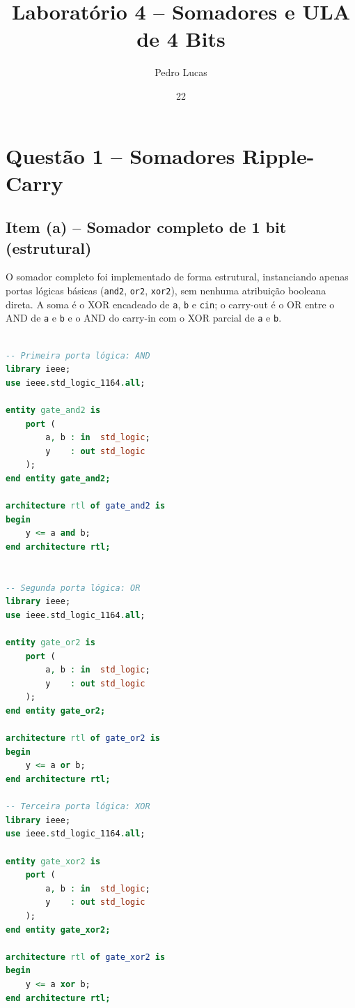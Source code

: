 \documentclass[report, 12pt]{uftreport}
\title{Laboratório 4 -- Somadores e ULA de 4 Bits}
\author{Pedro Lucas}{Moreira}
\date{22}{9}{2026}
\begin{document}
\frontmatter
\maketitle
\makefrontpage

\mainmatter
{}

\chapter{Questão 1 -- Somadores Ripple-Carry}

\section{Item (a) -- Somador completo de 1 bit (estrutural)}

O somador completo foi implementado de forma estrutural, instanciando apenas portas lógicas básicas (\texttt{and2}, \texttt{or2}, \texttt{xor2}), sem nenhuma atribuição booleana direta. A soma é o XOR encadeado de \texttt{a}, \texttt{b} e \texttt{cin}; o carry-out é o OR entre o AND de \texttt{a} e \texttt{b} e o AND do carry-in com o XOR parcial de \texttt{a} e \texttt{b}.

\begin{lstlisting}[language=VHDL]

-- Primeira porta lógica: AND
library ieee;
use ieee.std_logic_1164.all;

entity gate_and2 is
    port (
        a, b : in  std_logic;
        y    : out std_logic
    );
end entity gate_and2;

architecture rtl of gate_and2 is
begin
    y <= a and b;
end architecture rtl;


-- Segunda porta lógica: OR
library ieee;
use ieee.std_logic_1164.all;

entity gate_or2 is
    port (
        a, b : in  std_logic;
        y    : out std_logic
    );
end entity gate_or2;

architecture rtl of gate_or2 is
begin
    y <= a or b;
end architecture rtl;

-- Terceira porta lógica: XOR
library ieee;
use ieee.std_logic_1164.all;

entity gate_xor2 is
    port (
        a, b : in  std_logic;
        y    : out std_logic
    );
end entity gate_xor2;

architecture rtl of gate_xor2 is
begin
    y <= a xor b;
end architecture rtl;
\end{lstlisting}
\end{document}
